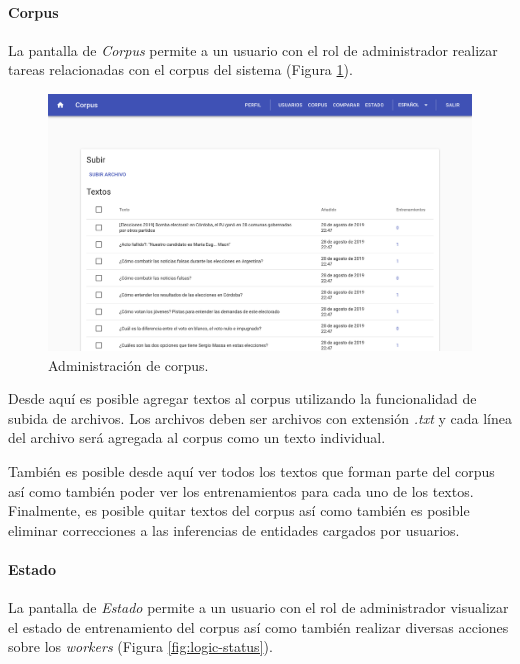\documentclass[12pt,a4paper,]{scrartcl}
\let\oldparagraph\paragraph
\renewcommand{\paragraph}[1]{\oldparagraph{#1}\mbox{}}
\begin{document}
\hypertarget{corpus}{%
\paragraph{Corpus}\label{corpus}}

La pantalla de \emph{Corpus} permite a un usuario con el rol de administrador realizar tareas relacionadas con el corpus del sistema (Figura \ref{fig:logic-corpus-management}).

\begin{figure}[H]

{\centering \includegraphics{assets/logic/corpus-management.pdf} 

}

\caption{Administración de corpus.}\label{fig:logic-corpus-management}
\end{figure}

Desde aquí es posible agregar textos al corpus utilizando la funcionalidad de subida de archivos. Los archivos deben ser archivos con extensión \emph{.txt} y cada línea del archivo será agregada al corpus como un texto individual.

También es posible desde aquí ver todos los textos que forman parte del corpus así como también poder ver los entrenamientos para cada uno de los textos. Finalmente, es posible quitar textos del corpus así como también es posible eliminar correcciones a las inferencias de entidades cargados por usuarios.

\hypertarget{estado}{%
\paragraph{Estado}\label{estado}}

La pantalla de \emph{Estado} permite a un usuario con el rol de administrador visualizar el estado de entrenamiento del corpus así como también realizar diversas acciones sobre los \emph{workers} (Figura \ref{fig:logic-status}).
\end{document}
